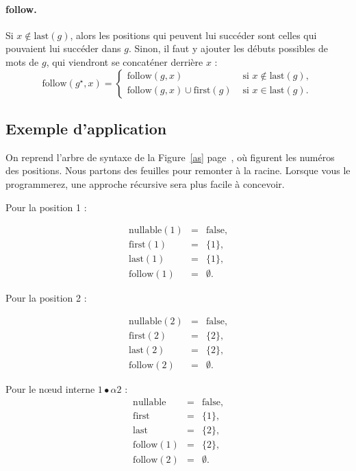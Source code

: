 \paragraph{follow.}
Si $x \not\in \mbox{last}(g)$, alors les positions qui peuvent lui succ{\'e}der sont celles qui pouvaient lui succ{\'e}der dans $g$.
Sinon, il faut y ajouter les d{\'e}buts possibles de mots de $g$, qui viendront se concat{\'e}ner derri{\`e}re $x$ : 
$$\mbox{follow}(g^\star,x)=\left\{
\begin{array}{ll}
\mbox{follow}(g,x)& \mbox{ si } x \not\in \mbox{last}(g), \\
\mbox{follow}(g,x)\cup \mbox{first}(g)& \mbox{ si } x \in \mbox{last}(g).
\end{array}
\right.
$$
\subsection{Exemple d'application}

On reprend l'arbre de syntaxe de la Figure~\ref{as} page~\pageref{as}, o{\`u} figurent les num{\'e}ros des positions. 
Nous partons des feuilles pour remonter {\`a} la racine. Lorsque vous le programmerez, une approche r{\'e}cursive sera plus facile {\`a} concevoir. 

Pour la position 1 : 

$$\begin{array}{lcl}
\mbox{nullable}(1)&=&\mbox{false},\\
\mbox{first}(1)&=&\{1\},\\
\mbox{last}(1)&=&\{1\},\\
\mbox{follow}(1)&=&\emptyset.
\end{array}
$$

Pour la position 2 : 

$$\begin{array}{lcl}
\mbox{nullable}(2)&=&\mbox{false},\\
\mbox{first}(2)&=&\{2\},\\
\mbox{last}(2)&=&\{2\},\\
\mbox{follow}(2)&=&\emptyset.
\end{array}
$$

Pour le n\oe{}ud interne $1\bullet \alpha2$ : 
$$\begin{array}{lcl}
\mbox{nullable}&=&\mbox{false},\\
\mbox{first}&=&\{1\},\\
\mbox{last}&=&\{2\},\\
\mbox{follow}(1)&=&\{2\},\\
\mbox{follow}(2)&=&\emptyset.
\end{array}
$$

